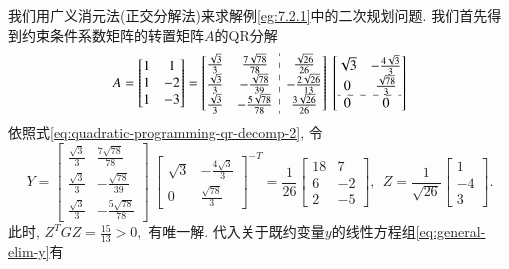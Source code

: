 \begin{eg}
\label{eg:7.2.2}
我们用广义消元法(正交分解法)来求解例\eqref{eg:7.2.1}中的二次规划问题. 我们首先得到约束条件系数矩阵的转置矩阵$A$的QR分解
\begin{equation*}
A = \begin{bmatrix} 1 & 1 \\ 1 & -2 \\ 1 & -3 \end{bmatrix} = \left[\begin{array}{@{}cc:c@{}} \frac{\sqrt{3}}{3} & \frac{7 \sqrt{78}}{78} & \frac{\sqrt{26}}{26} \\ \frac{\sqrt{3}}{3} & - \frac{\sqrt{78}}{39} & - \frac{2 \sqrt{26}}{13} \\ \frac{\sqrt{3}}{3} & - \frac{5 \sqrt{78}}{78} & \frac{3 \sqrt{26}}{26} \end{array}\right] ~ \left[\begin{array}{@{}cc@{}} \sqrt{3} & - \frac{4 \sqrt{3}}{3} \\ 0 & \frac{\sqrt{78}}{3} \\ \hdashline 0 & 0 \end{array}\right]
\end{equation*}
依照式\eqref{eq:quadratic-programming-qr-decomp-2}, 令
\begin{equation*}
Y = \left[\begin{matrix} \frac{\sqrt{3}}{3} & \frac{7 \sqrt{78}}{78} \\ \frac{\sqrt{3}}{3} & - \frac{\sqrt{78}}{39} \\ \frac{\sqrt{3}}{3} & - \frac{5 \sqrt{78}}{78} \end{matrix}\right] ~ \left[\begin{matrix} \sqrt{3} & - \frac{4 \sqrt{3}}{3} \\ 0 & \frac{\sqrt{78}}{3} \end{matrix}\right]^{-T} = \frac{1}{26} \left[\begin{matrix} 18 & 7 \\ 6 & -2 \\ 2 & -5 \end{matrix}\right], ~~ Z = \frac{1}{\sqrt{26}} \left[\begin{matrix} 1 \\ -4 \\ 3 \end{matrix}\right].
\end{equation*}
此时, $Z^T G Z = \frac{15}{13} > 0,$ 有唯一解. 代入关于既约变量$y$的线性方程组\eqref{eq:general-elim-y}有
\begin{equation*}

\end{equation*}
\end{eg}
